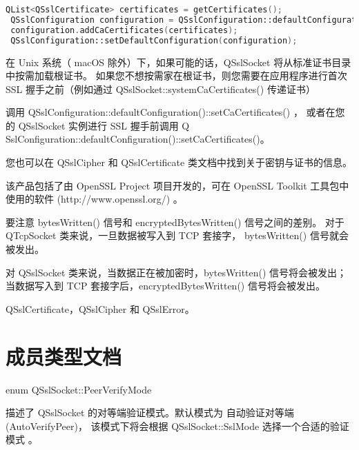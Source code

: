 \begin{lstlisting}[language=C++]
 QList<QSslCertificate> certificates = getCertificates();
 QSslConfiguration configuration = QSslConfiguration::defaultConfiguration();
 configuration.addCaCertificates(certificates);
 QSslConfiguration::setDefaultConfiguration(configuration);
\end{lstlisting}


\begin{notice}
在 Unix 系统（ macOS 除外）下，如果可能的话，QSslSocket 将从标准证书目录中按需加载根证书。
如果您不想按需家在根证书，则您需要在应用程序进行首次 SSL 握手之前（例如通过 QSslSocket::systemCaCertificates() 传递证书）

调用 QSslConfiguration::defaultConfiguration()::setCaCertificates() ，
或者在您的 QSslSocket 实例进行 SSL 握手前调用 Q
SslConfiguration::defaultConfiguration()::setCaCertificates()。
\end{notice}

您也可以在 QSslCipher 和 QSslCertificate 类文档中找到关于密钥与证书的信息。

该产品包括了由 OpenSSL Project 项目开发的，可在 OpenSSL Toolkit 工具包中使用的软件 (http://www.openssl.org/) 。

\begin{notice}
要注意 bytesWritten() 信号和 encryptedBytesWritten() 信号之间的差别。 
对于 QTcpSocket 类来说，一旦数据被写入到 TCP 套接字， bytesWritten() 信号就会被发出。 

对 QSslSocket 类来说，当数据正在被加密时，bytesWritten() 信号将会被发出；
当数据写入到 TCP 套接字后，encryptedBytesWritten() 信号将会被发出。
\end{notice}

\begin{seeAlso}
QSslCertificate，QSslCipher 和 QSslError。
\end{seeAlso}

\section{成员类型文档}

enum QSslSocket::PeerVerifyMode

描述了 QSslSocket 的对等端验证模式。默认模式为 自动验证对等端 (AutoVerifyPeer)，
该模式下将会根据 QSslSocket::SslMode 选择一个合适的验证模式 。

